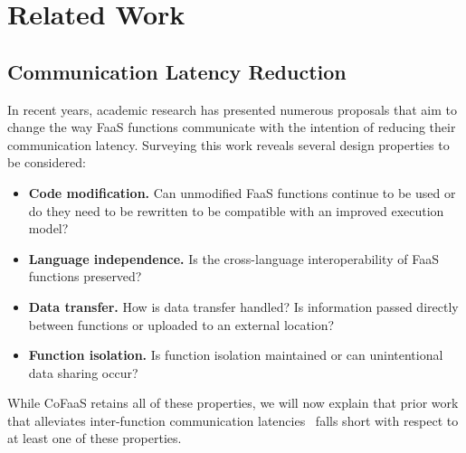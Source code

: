 \section{Related Work}
\label{sec:related-work}

\subsection{Communication Latency Reduction}

In recent years, academic research has presented numerous proposals that aim to change the way FaaS functions communicate with the intention of reducing their communication latency. Surveying this work reveals several design properties to be considered:
\begin{itemize}
\item {\bf Code modification.} Can unmodified FaaS functions continue to be used or do they need to be rewritten to be compatible with an improved execution model?
\item {\bf Language independence.} Is the cross-language interoperability of FaaS functions preserved?
\item {\bf Data transfer.} How is data transfer handled? Is information passed directly between functions or uploaded to an external location?
\item {\bf Function isolation.} Is function isolation maintained or can unintentional data sharing occur?
\end{itemize}
While CoFaaS retains all of these properties, we will now explain that prior work that alleviates inter-function communication latencies~\cite{kotni21_faast, mahgoub22_wisef, barcelona-pons19_faas_track,sreekanti20_cloud,shillaker20_faasm,jia21_night} falls short with respect to at least one of these properties. 



